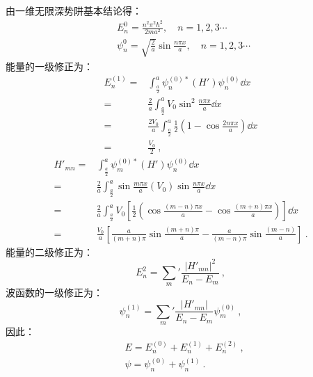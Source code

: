 \subsection{ }
由一维无限深势阱基本结论得：\\
\begin{equation}
\begin{aligned}
& E^{0}_{n} = \frac{n^{2} \pi^{2} \hbar^{2}}{2ma^{2}},\quad n = 1,2,3\cdots \\
& \psi^{0}_{n} = \sqrt{\frac{2}{a}} \sin{\frac{n \pi x}{a}},\quad n = 1,2,3\cdots
\end{aligned}~
\end{equation}
能量的一级修正为：\\
\begin{equation}
\begin{aligned}
E^{(1)}_{n} =& \int^{a}_{\frac{a}{2}} \psi^{(0)*}_{n} (H') \psi^{(0)}_{n} \dd{x} \\
=& \frac{2}{a} \int^{a}_{\frac{a}{2}} V_{0} \sin^{2}{\frac{n \pi x}{a}} \dd{x} \\
=& \frac{2V_{0}}{a} \int^{a}_{\frac{a}{2}} \frac{1}{2} (1-\cos{\frac{2n \pi x}{a}}) \dd{x} \\
=& \frac{V_{0}}{2}~,
\end{aligned}
\end{equation}
\begin{equation}
\begin{aligned}
H'_{mn} =& \int^{a}_{\frac{a}{2}} \psi^{(0)*}_{m}(H') \psi^{(0)}_{n} \dd{x} \\
=& \frac{2}{a} \int^{a}_{\frac{a}{2}} \sin{\frac{m \pi x}{a}} (V_{0}) \sin{\frac{n \pi x}{a}} \dd{x} \\
=& \frac{2}{a} \int^{a}_{\frac{a}{2}} V_{0} \left[ \frac{1}{2} (\cos{\frac{(m-n) \pi x}{a}} - \cos{\frac{(m+n) \pi x}{a}}) \right] \dd{x} \\
=& \frac{V_{0}}{a} \left[ \frac{a}{(m+n)\pi} \sin{\frac{(m+n)\pi}{a}} - \frac{a}{(m-n)\pi} \sin{\frac{(m-n)}{a}} \right]~.
\end{aligned}
\end{equation}
能量的二级修正为：\\
\begin{equation}
E^{2}_{n} = \sum_{m}' \frac{\left| H'_{mn} \right|^{2}}{E_{n} - E_{m}}~,
\end{equation}
波函数的一级修正为：\\
\begin{equation}
\psi^{(1)}_{n} = \sum_{m}' \frac{\left| H'_{mn} \right|}{E_{n} - E_{m}} \psi^{(0)}_{m}~,
\end{equation}
因此：\\
\begin{equation}
\begin{aligned}
& E = E^{(0)}_{n} + E^{(1)}_{n} + E^{(2)}_{n}~, \\
& \psi = \psi^{(0)}_{n} + \psi^{(1)}_{n}~.
\end{aligned}
\end{equation}



